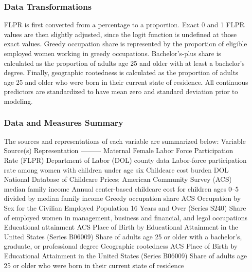 \documentclass[
  letterpaper,
  DIV=11,
  numbers=noendperiod]{scrartcl}
\begin{document}
\subsubsection{Data Transformations}\label{data-transformations}

FLPR is first converted from a percentage to a proportion. Exact 0 and 1
FLPR values are then slightly adjusted, since the logit function is
undefined at those exact values. Greedy occupation share is represented
by the proportion of eligible employed women working in greedy
occupations. Bachelor's-plus share is calculated as the proportion of
adults age 25 and older with at least a bachelor's degree. Finally,
geographic rootedness is calculated as the proportion of adults age 25
and older who were born in their current state of residence. All
continuous predictors are standardized to have mean zero and standard
deviation prior to modeling.

\subsubsection{Data and Measures
Summary}\label{data-and-measures-summary}

The sources and representations of each variable are summarized below:
\textbar{} Variable \textbar{} Source(s) \textbar{} Representation
\textbar{} \textbar---\textbar---\textbar---\textbar{} \textbar{}
Maternal Female Labor Force Participation Rate (FLPR) \textbar{}
Department of Labor (DOL) county data \textbar{} Labor-force
participation rate among women with children under age six \textbar{}
\textbar{} Childcare cost burden \textbar{} DOL National Database of
Childcare Prices; American Community Survey (ACS) median family income
\textbar{} Annual center-based childcare cost for children ages 0--5
divided by median family income \textbar{} \textbar{} Greedy occupation
share \textbar{} ACS Occupation by Sex for the Civilian Employed
Population 16 Years and Over (Series S240) \textbar{} Share of employed
women in management, business and financial, and legal occupations
\textbar{} \textbar{} Educational attainment \textbar{} ACS Place of
Birth by Educational Attainment in the United States (Series B06009)
\textbar{} Share of adults age 25 or older with a bachelor's, graduate,
or professional degree \textbar{} \textbar{} Geographic rootedness
\textbar{} ACS Place of Birth by Educational Attainment in the United
States (Series B06009) \textbar{} Share of adults age 25 or older who
were born in their current state of residence \textbar{}
\end{document}
